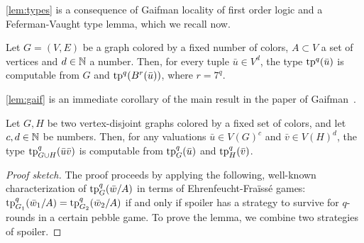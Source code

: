 
\cref{lem:types} is a consequence of Gaifman locality of first order logic and a Feferman-Vaught type  lemma, which we recall now.
\medskip



\begin{lemma}\label{lem:gaif}
  Let $G=(V,E)$ be a graph colored by a fixed number of colors, $A\subset V$ a set of vertices and $d\in \mathbb{N}$ a number.
  Then, for every tuple $\bar u\in V^d$, the type  $\mathrm{tp}^q(\bar u)$ is computable from $G$ and $\mathrm{tp}^q(B^r(\bar u))$, where $r=7^q$.
\end{lemma}
\cref{lem:gaif} is an immediate corollary of the main result in the paper of Gaifman~\cite{gaifman1982local}.



\begin{lemma}\label{lem:fv}
  Let $G,H$ be two vertex-disjoint  graphs colored by a fixed set of colors, and let 
  $c,d\in\mathbb{N}$  be numbers.
    Then, for any valuations
 $\bar u\in V(G)^{c}$ and $\bar v\in V(H)^{d}$, 
 the type 
 $\mathrm{tp}^q_{G\cup H}(\bar u\bar v)$
 is computable from $\mathrm{tp}^q_G(\bar u)$
 and $\mathrm{tp}^q_H(\bar v)$.
\end{lemma}
\begin{proof}[Proof sketch]The proof proceeds by applying the following, well-known characterization of $\mathrm{tp}^q_G(\bar w/A)$ in terms of Ehrenfeucht-Fra\"iss\'e games:
$\mathrm{tp}^q_{G_1}(\bar w_1/A)=\mathrm{tp}^q_{G_2}(\bar w_2/A)$
if and only if spoiler has a strategy to survive for $q$-rounds in a certain pebble game.
To prove the lemma, we combine two strategies of spoiler.
\end{proof}


